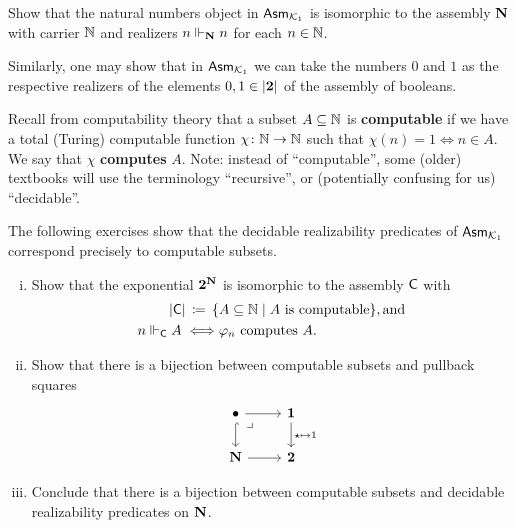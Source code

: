\begin{exercise}\label{exer:nno-in-Asm-K1}
  Show that the natural numbers object in \(\mathsf{Asm}_{\mathcal{K}_1}\) is isomorphic to the
  assembly \(\mathbf N\) with carrier \(\mathbb N\) and realizers
  \(n \Vdash_\mathbf N n\) for each \(n \in \mathbb N\).
\end{exercise}

Similarly, one may show that in \(\mathsf{Asm}_{\mathcal{K}_1}\) we can take the numbers \(0\)
and \(1\) as the respective realizers of the elements \(0,1 \in \lvert\mathbf 2\rvert\)
of the assembly of booleans.

Recall from computability theory that a subset \(A \subseteq \mathbb N\) is
\textbf{computable} if we have a total (Turing) computable function
\(\chi \colon \mathbb N \to \mathbb N\) such that
\(\chi(n) = 1 \iff n \in A\).
%
We say that \(\chi\) \textbf{computes} \(A\).
%
Note: instead of ``computable'', some (older) textbooks will use the terminology
``recursive'', or (potentially confusing for us) ``decidable''.

The following exercises show that the decidable realizability predicates of
\(\mathsf{Asm}_{\mathcal{K}_1}\) correspond precisely to computable subsets.


\begin{exercise}\label{exer:decidable-is-computable}\leavevmode
  \begin{enumerate}[(i)]
  \item Show that the exponential \(\mathbf 2^\mathbf N\) is isomorphic to the assembly
    \(\mathsf{C}\) with
    \begin{align*}
      \lvert\mathsf{C}\rvert \,\coloneqq\, \{&A \subseteq \mathbb N \mid A \text{ is computable}\}, \text{and} \\
      n \Vdash_{\mathsf{C}} A \iff &\varphi_{n} \text{ computes } A.
    \end{align*}
  \item Show that there is a bijection between computable subsets and pullback
    squares
    \[
      \begin{tikzcd}
        \bullet \pbcorner \ar[r] \ar[d,hookrightarrow]
        & \One \ar[d,"\star \mapsto 1"] \\
        \NatAsm \ar[r] & \Two
      \end{tikzcd}
    \]
  \item Conclude that there is a bijection between computable subsets and
    decidable realizability predicates on \(\mathbf N\).
  \end{enumerate}
\end{exercise}

